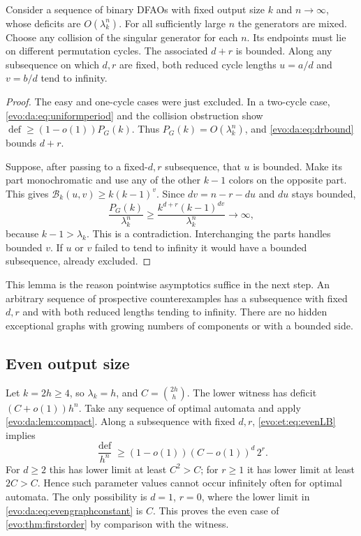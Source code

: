 \documentclass[11pt,a4paper]{article}
\numberwithin{equation}{section}
\theoremstyle{definition}
\theoremstyle{remark}
\newcommand{\Bip}{\mathcal B}
\newcommand{\defi}{\operatorname{def}}
\begin{document}
\begin{lemma}\label{evo:da:lem:compact}
Consider a sequence of binary DFAOs with fixed output size $k$ and
$n\to\infty$, whose deficits are $O(\lambda_k^n)$. For all sufficiently large
$n$ the generators are mixed. Choose any collision of the singular generator
for each $n$. Its endpoints must lie on different permutation cycles. The
associated $d+r$ is bounded. Along any subsequence on which $d,r$ are fixed,
both reduced cycle lengths $u=a/d$ and $v=b/d$ tend to infinity.
\end{lemma}
\begin{proof}
The easy and one-cycle cases were just excluded. In a two-cycle case,
\eqref{evo:da:eq:uniformperiod} and the collision obstruction show
$\defi\ge(1-o(1))P_G(k)$. Thus $P_G(k)=O(\lambda_k^n)$, and
\eqref{evo:da:eq:drbound} bounds $d+r$.

Suppose, after passing to a fixed-$d,r$ subsequence, that $u$ is bounded.
Make its part monochromatic and use any of the other $k-1$ colors on the
opposite part. This gives $\Bip_k(u,v)\ge k(k-1)^v$. Since $dv=n-r-du$ and
$du$ stays bounded,
\[
 \frac{P_G(k)}{\lambda_k^n}
 \ge\frac{k^{d+r}(k-1)^{dv}}{\lambda_k^n}\longrightarrow\infty,
\]
because $k-1>\lambda_k$. This is a contradiction. Interchanging the parts
handles bounded $v$. If $u$ or $v$ failed to tend to infinity it would have a
bounded subsequence, already excluded.
\end{proof}

This lemma is the reason pointwise asymptotics suffice in the next step. An
arbitrary sequence of prospective counterexamples has a subsequence with
fixed $d,r$ and with both reduced lengths tending to infinity. There are no
hidden exceptional graphs with growing numbers of components or with a
bounded side.

\subsection{Even output size}

Let $k=2h\ge4$, so $\lambda_k=h$, and $C=\binom{2h}{h}$. The lower witness has
deficit $(C+o(1))h^n$. Take any sequence of optimal automata and apply
\cref{evo:da:lem:compact}. Along a subsequence with fixed $d,r$,
\eqref{evo:et:eq:evenLB} implies
\begin{equation}\label{evo:da:eq:evengraphconstant}
 \frac{\defi}{h^n}\ge(1-o(1))(C-o(1))^d\,2^r.
\end{equation}
For $d\ge2$ this has lower limit at least $C^2>C$; for $r\ge1$ it has lower
limit at least $2C>C$. Hence such parameter values cannot occur infinitely
often for optimal automata. The only possibility is $d=1$, $r=0$, where the
lower limit in \eqref{evo:da:eq:evengraphconstant} is $C$. This proves the
even case of \cref{evo:thm:firstorder} by comparison with the witness.
\end{document}
